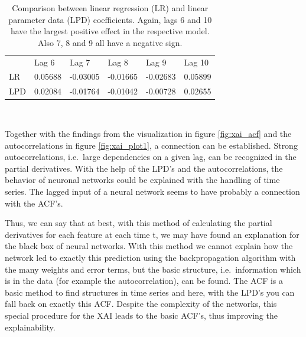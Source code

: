 \documentclass[
]{article}
\begin{document}
\begin{table}[!h]

\caption{\label{tab:lpd_tab}Comparison between linear regression (LR) and linear parameter data (LPD) coefficients. Again, lags 6 and 10 have the largest positive effect in the respective model. Also 7, 8 and 9 all have a negative sign.}
\centering
\begin{tabular}[t]{>{}l>{}l>{}l>{}l>{}l>{}l}
\toprule
\textcolor[HTML]{000000}{} & \textcolor[HTML]{f6004a}{Lag 6} & \textcolor[HTML]{004c6d}{Lag 7} & \textcolor[HTML]{0075b6}{Lag 8} & \textcolor[HTML]{665191}{Lag 9} & \textcolor[HTML]{ff7c43}{Lag 10}\\
\textcolor[HTML]{000000}{LR} & \textcolor[HTML]{f6004a}{0.05688} & \textcolor[HTML]{004c6d}{-0.03005} & \textcolor[HTML]{0075b6}{-0.01665} & \textcolor[HTML]{665191}{-0.02683} & \textcolor[HTML]{ff7c43}{0.05899}\\
\textcolor[HTML]{000000}{LPD} & \textcolor[HTML]{f6004a}{0.02084} & \textcolor[HTML]{004c6d}{-0.01764} & \textcolor[HTML]{0075b6}{-0.01042} & \textcolor[HTML]{665191}{-0.00728} & \textcolor[HTML]{ff7c43}{0.02655}\\
\bottomrule
\end{tabular}
\end{table}

~

Together with the findings from the visualization in figure
\ref{fig:xai_acf} and the autocorrelations in figure
\ref{fig:xai_plot1}, a connection can be established. Strong
autocorrelations, i.e.~large dependencies on a given lag, can be
recognized in the partial derivatives. With the help of the LPD's and
the autocorrelations, the behavior of neuronal networks could be
explained with the handling of time series. The lagged input of a neural
network seems to have probably a connection with the ACF's.

Thus, we can say that at best, with this method of calculating the
partial derivatives for each feature at each time t, we may have found
an explanation for the black box of neural networks. With this method we
cannot explain how the network led to exactly this prediction using the
backpropagation algorithm with the many weights and error terms, but the
basic structure, i.e.~information which is in the data (for example the
autocorrelation), can be found. The ACF is a basic method to find
structures in time series and here, with the LPD's you can fall back on
exactly this ACF. Despite the complexity of the networks, this special
procedure for the XAI leads to the basic ACF's, thus improving the
explainability.
\end{document}
